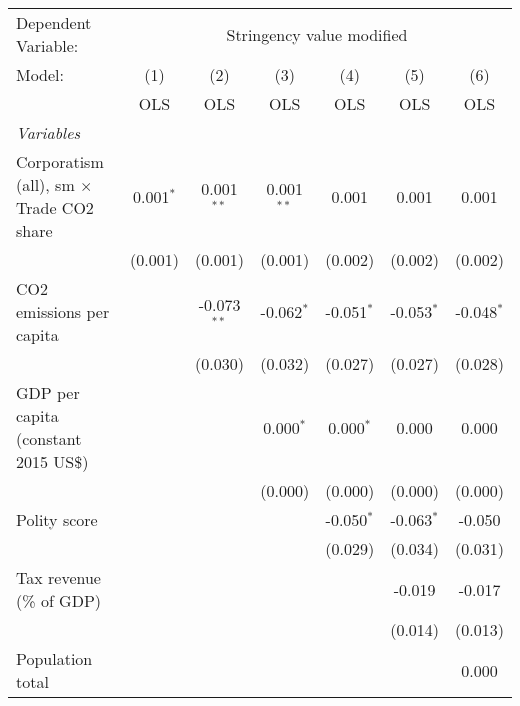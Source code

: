 
\begingroup
\centering
\begin{tabular}{lcccccc}
   \toprule
   Dependent Variable: & \multicolumn{6}{c}{Stringency value modified}\\
   Model:                                          & (1)         & (2)           & (3)          & (4)          & (5)          & (6)\\  
                                                   &  OLS        & OLS           & OLS          & OLS          & OLS          & OLS\\  
   \midrule
   \emph{Variables}\\
   Corporatism (all), sm $\times$ Trade CO2 share  & 0.001$^{*}$ & 0.001$^{**}$  & 0.001$^{**}$ & 0.001        & 0.001        & 0.001\\   
                                                   & (0.001)     & (0.001)       & (0.001)      & (0.002)      & (0.002)      & (0.002)\\   
   CO2 emissions per capita                        &             & -0.073$^{**}$ & -0.062$^{*}$ & -0.051$^{*}$ & -0.053$^{*}$ & -0.048$^{*}$\\   
                                                   &             & (0.030)       & (0.032)      & (0.027)      & (0.027)      & (0.028)\\   
   GDP per capita (constant 2015 US\$)             &             &               & 0.000$^{*}$  & 0.000$^{*}$  & 0.000        & 0.000\\   
                                                   &             &               & (0.000)      & (0.000)      & (0.000)      & (0.000)\\   
   Polity score                                    &             &               &              & -0.050$^{*}$ & -0.063$^{*}$ & -0.050\\   
                                                   &             &               &              & (0.029)      & (0.034)      & (0.031)\\   
   Tax revenue (\% of GDP)                         &             &               &              &              & -0.019       & -0.017\\   
                                                   &             &               &              &              & (0.014)      & (0.013)\\   
   Population total                                &             &               &              &              &              & 0.000\\   

\end{tabular}
